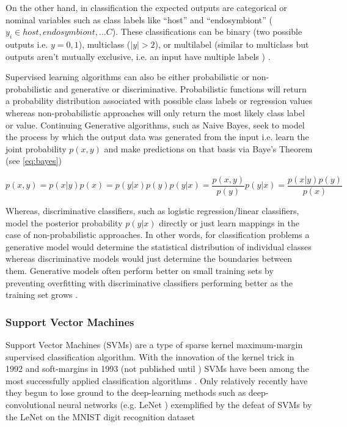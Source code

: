 On the other hand, in classification the expected outputs are 
categorical or nominal variables such as class labels like ``host'' and ``endosymbiont'' 
(\(y_{i} \in {host, endosymbiont, ... C}\)).  These classifications can be binary (two possible outputs i.e. 
\(y={0,1}\)), multiclass (\(\left\vert{{y}}\right\vert > 2\)),
or multilabel (similar to multiclass but outputs aren't mutually exclusive, i.e. an input have multiple labels
) \citep{Murphy2012}. 

Supervised learning algorithms can also be either probabilistic or non-probabilistic and generative or 
discriminative.
Probabilistic functions will return a probability distribution associated with possible class labels or
regression values whereas non-probabilistic approaches will only return the most likely class label or value.
Continuing 
Generative algorithms, such as Naive Bayes, seek to model the process by which the output data was generated 
from the input i.e. learn the joint probability \(p(x,y)\) and make predictions on that basis via Baye's Theorem (see \ref{eq:bayes}) 

\[
    p(x,y) = p(x|y)p(x) = p(y|x)p(y)
    p(y|x) = \frac{p(x,y)}{p(y)}
    p(y|x) = \frac{p(x|y)p(y)}{p(x)}
    \label{eq:bayes}
\]

Whereas, discriminative classifiers, such as logistic regression/linear classifiers,
model the posterior probability \(p(y|x)\) directly or just learn mappings in the case of non-probabilistic approaches.
In other words, for classification problems a generative model would determine the statistical distribution of 
individual classes whereas discriminative models would just determine the boundaries between them.
Generative models often perform better on small training sets by preventing overfitting with discriminative
classifiers performing better as the training set grows \citep{Ng2002}.

\subsubsection{Support Vector Machines}

Support Vector Machines (SVMs) are a type of sparse kernel maximum-margin supervised classification algorithm.
With the innovation of the kernel trick in 1992 \citep{Boser1992} and soft-margins in 1993 (not published until \citep{Cortes1995}) SVMs have been 
among the most successfully applied classification algorithms \citep{Fernandez-Delgado2014}.
Only relatively recently have they begun to lose ground to the deep-learning methods such as deep-convolutional neural networks (e.g. LeNet \citep{LeCunn1998}) exemplified 
by the defeat of SVMs by the LeNet on the MNIST digit recognition dataset \citep{Hinton2006,Bengio2007} \citep{Bengio2013}

